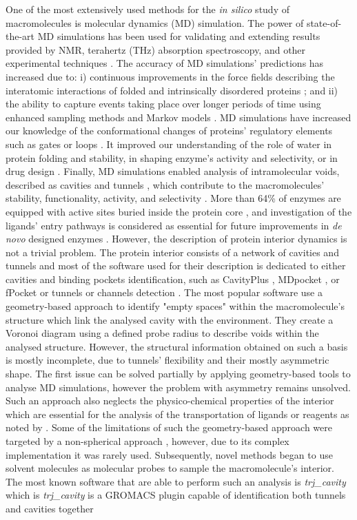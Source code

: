 \documentclass[9pt,tutorial, pubversion]{livecoms}
\begin{document}
One of the most extensively used methods for the \textit{in silico} study of macromolecules is  molecular dynamics (MD) simulation. The power of state-of-the-art MD simulations has been used for validating and extending results provided by NMR, terahertz (THz) absorption spectroscopy, and other experimental techniques \cite{Bottaro2018}. The accuracy of MD simulations’ predictions has increased due to:  i) continuous improvements in the force fields describing the interatomic interactions of folded and intrinsically disordered proteins \cite{Huang2017}; and ii) the ability to capture events taking place over longer periods of time using enhanced sampling methods \cite{Bernardi2015} and Markov models \cite{Husic2018}. MD simulations have increased our knowledge of the conformational changes of proteins’ regulatory elements such as gates \cite{Gora2013} or loops \cite{Kress2018}. It improved our understanding of the role of water in protein folding and stability, in shaping enzyme’s activity and selectivity, or in drug design \cite{Mondal2017,Spyrakis2017}. Finally, MD simulations enabled analysis of intramolecular voids, described as cavities \cite{Stank2016} and tunnels \cite{Kingsley2015,Marques2016}, which contribute to the macromolecules’ stability, functionality, activity, and selectivity \cite{Kokkonen2019}. More than 64\% of enzymes are equipped with active sites buried inside the protein core \cite{Pravda2014}, and investigation of the ligands’ entry pathways is considered as essential for future improvements in \textit{de novo} designed enzymes \cite{Huang2016}. However, the description of protein interior dynamics is not a trivial problem. The protein interior consists of a network of cavities and tunnels and most of the software used for their description is dedicated to either cavities and binding pockets identification, such as CavityPlus \cite{Xu2018}, MDpocket \cite{Schmidtke2011}, or fPocket \cite{Guilloux2009} or tunnels or channels detection \cite{Brezovsky2013}. The most popular software use a geometry-based approach to identify "empty spaces" within the macromolecule's structure which link the analysed cavity with the environment. They create a Voronoi diagram using a defined probe radius to describe voids within the analysed structure. However, the structural information obtained on such a basis is mostly incomplete, due to tunnels’ flexibility and their mostly asymmetric shape. The first issue can be solved partially by applying geometry-based tools to analyse MD simulations, however the problem with asymmetry remains unsolved. Such an approach also neglects the physico-chemical properties of the interior which are essential for the analysis of the transportation of ligands or reagents as noted by \cite{Kaushik2018}. Some of the limitations of such the geometry-based approach were targeted by a non-spherical approach \cite{Benkaidali2014}, however, due to its complex implementation it was rarely used. Subsequently, novel methods began to use solvent molecules as molecular probes \cite{Mitusinska2020} to sample the macromolecule's interior. The most known software that are able to perform such an analysis is \textit{trj\_cavity} \cite{Paramo2014} which is \textit{trj\_cavity} is a GROMACS plugin capable of identification both tunnels and cavities together 
\end{document}

